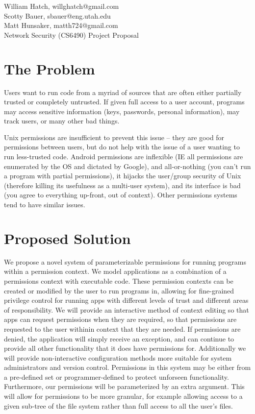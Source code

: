 \documentclass[12pt,letterpaper]{article}
\begin{document}
\noindent
William Hatch, willghatch@gmail.com \\
\noindent
Scotty Bauer, sbauer@eng.utah.edu \\
\noindent
Matt Hunsaker, matth724@gmail.com \\
\noindent
Network Security (CS6490) Project Proposal

\section*{The Problem}

Users want to run code from a myriad of sources that are often either partially
trusted or completely untrusted.  If given full access to a user account,
programs may access sensitive information (keys, passwords, personal
information), may track users, or many other bad things.

Unix permissions are insufficient to prevent this issue -- they are good for
permissions between users, but do not help with the issue of a user wanting to
run less-trusted code.  Android permissions are inflexible (IE all permissions
are enumerated by the OS and dictated by Google), and all-or-nothing (you can't
run a program with partial permissions), it hijacks the user/group security of
Unix (therefore killing its usefulness as a multi-user system), and its
interface is bad (you agree to everything up-front, out of context).  Other
permissions systems tend to have similar issues.

\section*{Proposed Solution}

We propose a novel system of parameterizable permissions for running programs
within a permission context.  We model applications as a combination of a
permissions context with executable code.  These permission contexts can be
created or modified by the user to run programs in, allowing for fine-grained
privilege control for running apps with different levels of trust and different
areas of responsibility.  We will provide an interactive method of context
editing so that apps can request permissions when they are required, so that
permissions are requested to the user withinin context that they are needed.
If permissions are denied, the application will simply receive an exception,
and can continue to provide all other functionality that it does have
permissions for.  Additionally we will provide non-interactive configuration
methods more suitable for system administrators and version control.
Permissions in this system may be either from a pre-defined set or 
programmer-defined to protect unforseen functionality.  Furthermore, our 
permissions will be parameterized by an extra argument.  This will allow for
permissions to be more granular, for example allowing access to a given
sub-tree of the file system rather than full access to all the user's files.
\end{document}
